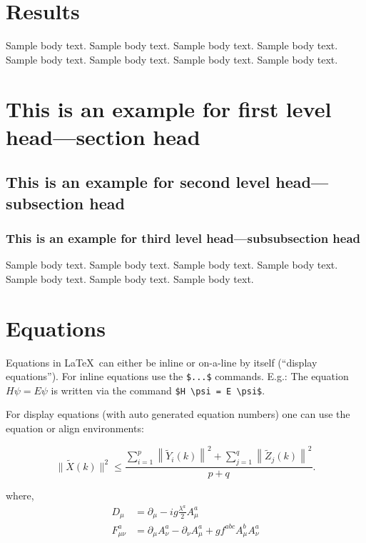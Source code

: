 \documentclass[sn-basic,pdflatex]{sn-jnl}
\theoremstyle{remark}
\theoremstyle{definition}
\begin{document}
\section{Results}\label{sec4}

Sample body text. Sample body text. Sample body text. Sample body text.
Sample body text. Sample body text. Sample body text. Sample body text.

\section{This is an example for first level head---section
head}\label{sec5}

\subsection{This is an example for second level head---subsection
head}\label{subsec2}

\subsubsection{This is an example for third level head---subsubsection
head}\label{subsubsec2}

Sample body text. Sample body text. Sample body text. Sample body text.
Sample body text. Sample body text. Sample body text.

\section{Equations}\label{sec6}

Equations in \LaTeX~can either be inline or on-a-line by itself
(``display equations''). For inline equations use the \texttt{\$...\$}
commands. E.g.: The equation \(H\psi = E \psi\) is written via the
command \texttt{\$H\ \textbackslash{}psi\ =\ E\ \textbackslash{}psi\$}.

For display equations (with auto generated equation numbers) one can use
the equation or align environments:

\begin{equation}
\|\tilde{X}(k)\|^2 \leq\frac{\sum\limits_{i=1}^{p}\left\|\tilde{Y}_i(k)\right\|^2+\sum\limits_{j=1}^{q}\left\|\tilde{Z}_j(k)\right\|^2 }{p+q}.\label{eq1}
\end{equation}

where, \begin{align}
D_\mu &=  \partial_\mu - ig \frac{\lambda^a}{2} A^a_\mu \nonumber \\
F^a_{\mu\nu} &= \partial_\mu A^a_\nu - \partial_\nu A^a_\mu + g f^{abc} A^b_\mu A^a_\nu \label{eq2}
\end{align}
\end{document}
